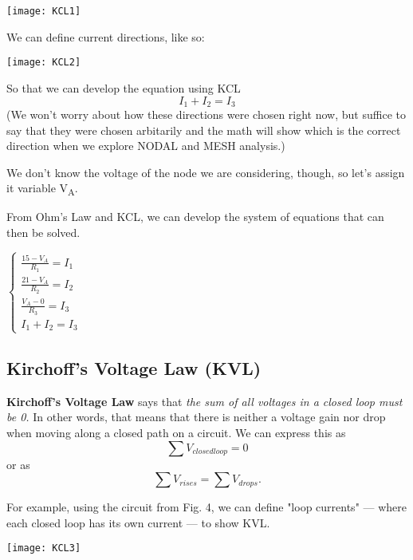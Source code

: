\documentclass[12pt,letterpaper]{article}
\begin{document}
\begin{center}
\texttt{[image: KCL1]} \label{Fig. 4}
\end{center}

We can define current directions, like so:

\begin{center}
\texttt{[image: KCL2]} \label{Fig. 5}
\end{center}

So that we can develop the equation using KCL \begin{equation} I_{1} + I_{2} = I_{3} \end{equation} (We won't worry about how these directions were chosen right now, but suffice to say that they were chosen arbitarily and the math will show which is the correct direction when we explore NODAL and MESH analysis.) \par

We don't know the voltage of the node we are considering, though, so let's assign it variable V\textsubscript{A}. \par

From Ohm's Law and KCL, we can develop the system of equations that can then be solved.

$\begin{cases}
\frac{15 - V_{A}}{R_{1}} = I_{1} \\
\frac{21 - V_{A}}{R_{2}} = I_{2} \\
\frac{V_A - 0}{R_{3}} = I_{3} \\
I_1 + I_2 = I_3
\end{cases}$

\subsection{Kirchoff's Voltage Law (KVL)}
\textbf{Kirchoff's Voltage Law} says that \textit{the sum of all voltages in a closed loop must be 0.} In other words, that means that there is neither a voltage gain nor drop when moving along a closed path on a circuit. We can express this as \begin{equation} \sum V_{closed loop} = 0 \end{equation} or as \begin{equation} \sum V_{rises} = \sum V_{drops}. \end{equation} \par

For example, using the circuit from Fig. 4, we can define "loop currents" --- where each closed loop has its own current --- to show KVL.
\begin{center}
\texttt{[image: KCL3]} \label{Fig. 6}
\end{center}
\end{document}
